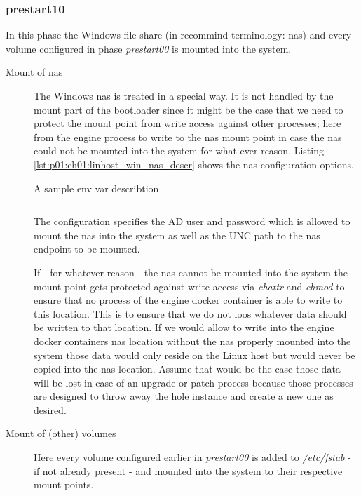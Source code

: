 			\subsubsection{prestart10}
			In this phase the Windows file share (in recommind terminology: nas) and every volume configured in phase \emph{prestart00} is mounted into the system.
			\begin{description}
				\item[Mount of nas] The Windows nas is treated in a special way. It is not handled by the mount part of the bootloader since it might be the case that we need to protect the mount point from write access against other processes; here from the engine process to write to the nas mount point in case the nas could not be mounted into the system for what ever reason. Listing \ref{lst:p01:ch01:linhost_win_nas_descr} shows the nas configuration options.
				\begin{listing}[H]
					\caption{A sample env var describtion}
					\label{lst:p01:ch01:linhost_win_nas_descr}
					\inputminted{yaml}{\relative{chapter_01/section_3.2/win_nas_description_example.yaml}}
				\end{listing}
				The configuration specifies the AD user and password which is allowed to mount the nas into the system as well as the UNC path to the nas endpoint to be mounted.
				
				If - for whatever reason - the nas cannot be mounted into the system the mount point gets protected against write access via \emph{chattr} and \emph{chmod} to ensure that no process of the engine docker container is able to write to this location. This is to ensure that we do not loos whatever data should be written to that location. If we would allow to write into the engine docker containers nas location without the nas properly mounted into the system those data would only reside on the Linux host but would never be copied into the nas location. Assume that would be the case those data will be lost in case of an upgrade or patch process because those processes are designed to throw away the hole instance and create a new one as desired.

				\item[Mount of (other) volumes] Here every volume configured earlier in \emph{prestart00} is added to \emph{/etc/fstab} - if not already present - and mounted into the system to their respective mount points. 
				

\end{description}
